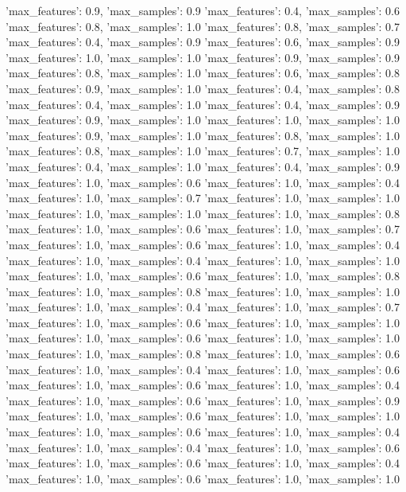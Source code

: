 {'max_features': 0.9, 'max_samples': 0.9}
{'max_features': 0.4, 'max_samples': 0.6}
{'max_features': 0.8, 'max_samples': 1.0}
{'max_features': 0.8, 'max_samples': 0.7}
{'max_features': 0.4, 'max_samples': 0.9}
{'max_features': 0.6, 'max_samples': 0.9}
{'max_features': 1.0, 'max_samples': 1.0}
{'max_features': 0.9, 'max_samples': 0.9}
{'max_features': 0.8, 'max_samples': 1.0}
{'max_features': 0.6, 'max_samples': 0.8}
{'max_features': 0.9, 'max_samples': 1.0}
{'max_features': 0.4, 'max_samples': 0.8}
{'max_features': 0.4, 'max_samples': 1.0}
{'max_features': 0.4, 'max_samples': 0.9}
{'max_features': 0.9, 'max_samples': 1.0}
{'max_features': 1.0, 'max_samples': 1.0}
{'max_features': 0.9, 'max_samples': 1.0}
{'max_features': 0.8, 'max_samples': 1.0}
{'max_features': 0.8, 'max_samples': 1.0}
{'max_features': 0.7, 'max_samples': 1.0}
{'max_features': 0.4, 'max_samples': 1.0}
{'max_features': 0.4, 'max_samples': 0.9}
{'max_features': 1.0, 'max_samples': 0.6}
{'max_features': 1.0, 'max_samples': 0.4}
{'max_features': 1.0, 'max_samples': 0.7}
{'max_features': 1.0, 'max_samples': 1.0}
{'max_features': 1.0, 'max_samples': 1.0}
{'max_features': 1.0, 'max_samples': 0.8}
{'max_features': 1.0, 'max_samples': 0.6}
{'max_features': 1.0, 'max_samples': 0.7}
{'max_features': 1.0, 'max_samples': 0.6}
{'max_features': 1.0, 'max_samples': 0.4}
{'max_features': 1.0, 'max_samples': 0.4}
{'max_features': 1.0, 'max_samples': 1.0}
{'max_features': 1.0, 'max_samples': 0.6}
{'max_features': 1.0, 'max_samples': 0.8}
{'max_features': 1.0, 'max_samples': 0.8}
{'max_features': 1.0, 'max_samples': 1.0}
{'max_features': 1.0, 'max_samples': 0.4}
{'max_features': 1.0, 'max_samples': 0.7}
{'max_features': 1.0, 'max_samples': 0.6}
{'max_features': 1.0, 'max_samples': 1.0}
{'max_features': 1.0, 'max_samples': 0.6}
{'max_features': 1.0, 'max_samples': 1.0}
{'max_features': 1.0, 'max_samples': 0.8}
{'max_features': 1.0, 'max_samples': 0.6}
{'max_features': 1.0, 'max_samples': 0.4}
{'max_features': 1.0, 'max_samples': 0.6}
{'max_features': 1.0, 'max_samples': 0.6}
{'max_features': 1.0, 'max_samples': 0.4}
{'max_features': 1.0, 'max_samples': 0.6}
{'max_features': 1.0, 'max_samples': 0.9}
{'max_features': 1.0, 'max_samples': 0.6}
{'max_features': 1.0, 'max_samples': 1.0}
{'max_features': 1.0, 'max_samples': 0.6}
{'max_features': 1.0, 'max_samples': 0.4}
{'max_features': 1.0, 'max_samples': 0.4}
{'max_features': 1.0, 'max_samples': 0.6}
{'max_features': 1.0, 'max_samples': 0.6}
{'max_features': 1.0, 'max_samples': 0.4}
{'max_features': 1.0, 'max_samples': 0.6}
{'max_features': 1.0, 'max_samples': 1.0}
